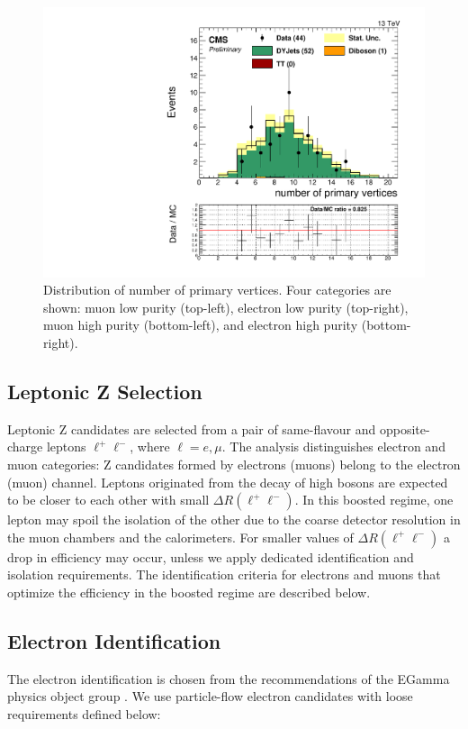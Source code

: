 \begin{figure}[h]
\begin{center}
\includegraphics[scale=0.37]{figures/control/nVtxEHP.pdf}
\caption[Distribution of number of primary vertices]{Distribution of number of primary vertices.  Four categories are shown: muon low purity (top-left), electron low purity (top-right), muon high purity (bottom-left), and electron high purity (bottom-right).}
\label{nVtx_VZ}
\end{center}
\end{figure}

\clearpage
\subsection{Leptonic Z Selection}

Leptonic Z candidates are selected from a pair of same-flavour and opposite-charge leptons $\ell^+\ell^-$, where $\ell = e, \mu$. The analysis distinguishes electron and muon categories: Z candidates formed by electrons (muons) belong to the electron (muon) channel. Leptons originated from the decay of high \ptrans bosons are expected to be closer to each other with small $\Delta R(\ell^+ \ell^-)$. In this boosted regime, one lepton may spoil the isolation of the other due to the coarse detector resolution in the muon chambers and the calorimeters. For smaller values of $\Delta R(\ell^+ \ell^-)$ a drop in efficiency may occur, unless we apply dedicated identification and isolation requirements. The identification criteria for electrons and muons that optimize the efficiency in the boosted regime are described below.

\subsection*{Electron Identification}
The electron identification is chosen from the recommendations of the EGamma physics object group \cite{egammaPOG}. We use particle-flow electron candidates with loose requirements defined below:

